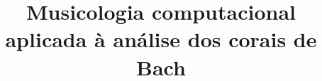 \documentclass[brazil]{article}
\begin{document}
\graphicspath{{figs/}}

\title{Musicologia computacional aplicada à análise dos corais de Bach}
\author{}{}{}{}

\begin{sumario}

\end{sumario}






\end{document}
